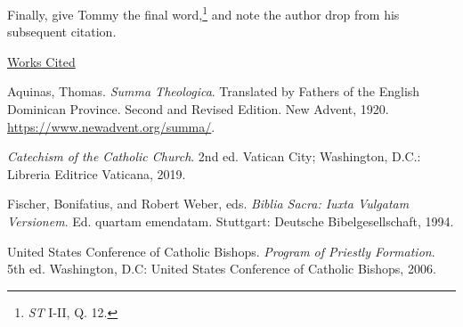 \documentclass[
    12pt,
    letterpaper,
    oneside,
    noraggedright
]{turabian-researchpaper}
\newlength{\cslhangindent}
\newenvironment{CSLReferences}[2]
 {
\newpage %
\centerline{\underline{Works Cited}} %
 \setlength{\parindent}{0pt}
 \singlespacing
  \let\oldpar\par
  \def\par{\hangindent=\cslhangindent\oldpar}
  \setlength{\parskip}{1em}
 }
{
}
\begin{document}
Finally, give Tommy the final word,\footnote{\emph{ST} I-II, Q. 12.} and
note the author drop from his subsequent citation.

\hypertarget{refs}{}
\begin{CSLReferences}{1}{0}
\leavevmode{}%
Aquinas, Thomas. \emph{Summa Theologica}. Translated by Fathers of the
English Dominican Province. Second and Revised Edition. New Advent,
1920. \url{https://www.newadvent.org/summa/}.

\leavevmode{}%
\emph{Catechism of the Catholic Church}. 2nd ed. Vatican City;
Washington, D.C.: Libreria Editrice Vaticana, 2019.

\leavevmode{}%
Fischer, Bonifatius, and Robert Weber, eds. \emph{Biblia Sacra: Iuxta
Vulgatam Versionem}. Ed. quartam emendatam. Stuttgart: Deutsche
Bibelgesellschaft, 1994.

\leavevmode{}%
United States Conference of Catholic Bishops. \emph{Program of Priestly
Formation}. 5th ed. Washington, D.C: United States Conference of
Catholic Bishops, 2006.

\end{CSLReferences}
\end{document}
